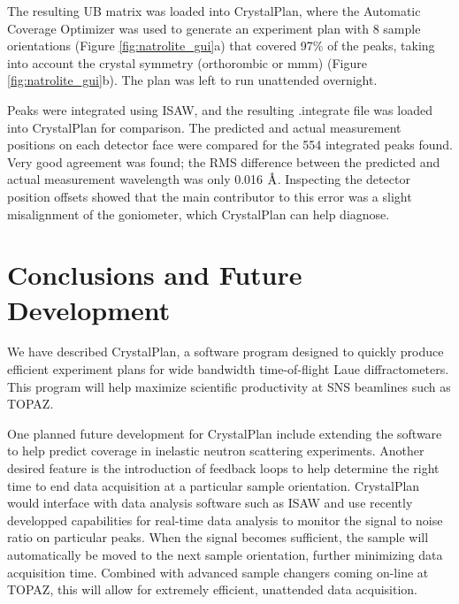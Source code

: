 \documentclass[final]{iucr}              %
\newcommand{\ang}{$\mathrm{\AA} $}
\begin{document}
The resulting UB matrix was loaded into CrystalPlan, where the Automatic
Coverage Optimizer was used to generate an experiment plan with 8 sample
orientations (Figure \ref{fig:natrolite_gui}a) that covered 97\% of the peaks,
taking into account the crystal symmetry (orthorombic or mmm) (Figure
\ref{fig:natrolite_gui}b). The plan was left to run unattended overnight.

Peaks were integrated using ISAW, and the resulting .integrate file was loaded
into CrystalPlan for comparison. The predicted and actual measurement
positions on each detector face were compared for the 554 integrated peaks
found. Very good agreement was found; the
RMS difference between the predicted and actual measurement wavelength was only
0.016 \ang. Inspecting the detector position offsets showed that the main
contributor to this error was a slight misalignment of the goniometer, which
CrystalPlan can help diagnose. 





\section{Conclusions and Future Development}

We have described CrystalPlan, a software program designed to quickly produce
efficient experiment plans for wide bandwidth time-of-flight Laue
diffractometers. This program will help maximize scientific productivity at SNS
beamlines such as TOPAZ.

One planned future development for CrystalPlan include extending the software
to help predict coverage in inelastic neutron scattering experiments. Another
desired feature is the introduction of feedback loops to help determine the
right time to end data acquisition at a particular sample orientation.
CrystalPlan would interface with data analysis software such as ISAW and use
recently developped capabilities for real-time data analysis to monitor
the  signal to noise ratio on particular peaks. When the signal becomes
sufficient, the sample will automatically be moved to the next sample
orientation, further minimizing data acquisition time. Combined with advanced
sample changers coming on-line at TOPAZ, this will allow for extremely
efficient, unattended data acquisition.
\end{document}
